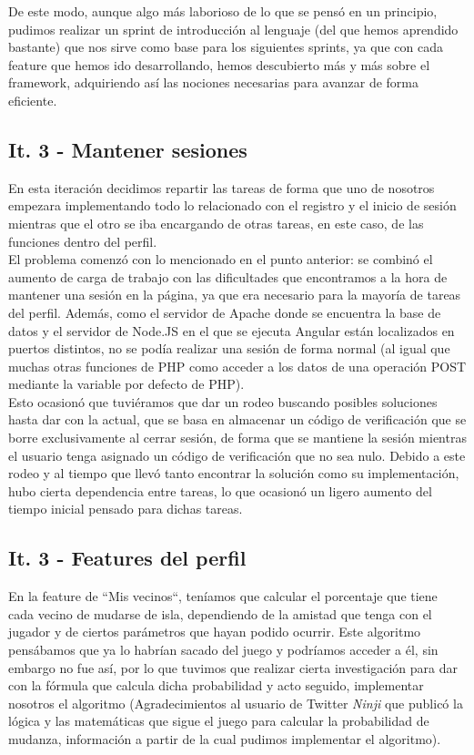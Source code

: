 De este modo, aunque algo más laborioso de lo que se pensó en un principio, pudimos realizar un sprint de introducción al lenguaje (del que hemos aprendido bastante) que nos sirve como base para los siguientes sprints, ya que con cada feature que hemos ido desarrollando, hemos descubierto más y más sobre el framework, adquiriendo así las nociones necesarias para avanzar de forma eficiente.

\subsection{It. 3 - Mantener sesiones}

En esta iteración decidimos repartir las tareas de forma que uno de nosotros empezara implementando todo lo relacionado con el registro y el inicio de sesión mientras que el otro se iba encargando de otras tareas, en este caso, de las funciones dentro del perfil.\\

El problema comenzó con lo mencionado en el punto anterior: se combinó el aumento de carga de trabajo con las dificultades que encontramos a la hora de mantener una sesión en la página, ya que era necesario para la mayoría de tareas del perfil. Además, como el servidor de Apache donde se encuentra la base de datos y el servidor de Node.JS en el que se ejecuta Angular están localizados en puertos distintos, no se podía realizar una sesión de forma normal (al igual que muchas otras funciones de PHP como acceder a los datos de una operación POST mediante la variable por defecto de PHP).\\

Esto ocasionó que tuviéramos que dar un rodeo buscando posibles soluciones hasta dar con la actual, que se basa en almacenar un código de verificación que se borre exclusivamente al cerrar sesión, de forma que se mantiene la sesión mientras el usuario tenga asignado un código de verificación que no sea nulo. Debido a este rodeo y al tiempo que llevó tanto encontrar la solución como su implementación, hubo cierta dependencia entre tareas, lo que ocasionó un ligero aumento del tiempo inicial pensado para dichas tareas.

\subsection{It. 3 - Features del perfil}

En la feature de ``Mis vecinos``, teníamos que calcular el porcentaje que tiene cada vecino de mudarse de isla, dependiendo de la amistad que tenga con el jugador y de ciertos parámetros que hayan podido ocurrir. Este algoritmo pensábamos que ya lo habrían sacado del juego y podríamos acceder a él, sin embargo no fue así, por lo que tuvimos que realizar cierta investigación para dar con la fórmula que calcula dicha probabilidad y acto seguido, implementar nosotros el algoritmo (Agradecimientos al usuario de Twitter \textit{Ninji} que publicó la lógica y las matemáticas que sigue el juego para calcular la probabilidad de mudanza, información a partir de la cual pudimos implementar el algoritmo).\\

